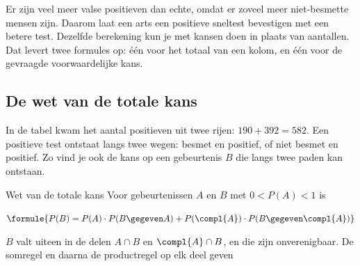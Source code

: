 
Er zijn veel meer valse positieven dan echte, omdat er zoveel meer niet-besmette mensen zijn. Daarom laat een arts een positieve sneltest bevestigen met een betere test. Dezelfde berekening kun je met kansen doen in plaats van aantallen. Dat levert twee formules op: één voor het totaal van een kolom, en één voor de gevraagde voorwaardelijke kans.

\subsection{De wet van de totale kans}

In de tabel kwam het aantal positieven uit twee rijen: $190 + 392 = 582$. Een positieve test ontstaat langs twee wegen: besmet en positief, of niet besmet en positief. Zo vind je ook de kans op een gebeurtenis $B$ die langs twee paden kan ontstaan.

\begin{theorie}
\begin{stelling}{Wet van de totale kans}
Voor gebeurtenissen $A$ en $B$ met $0 < P(A) < 1$ is

\vspace{1mm}
\qquad $\formule{P(B) = P(A) \cdot P(B \gegeven A) + P(\compl{A}) \cdot P(B \gegeven \compl{A})}$
\end{stelling}

\begin{bewijs}
$B$ valt uiteen in de delen $A \cap B$ en $\compl{A} \cap B$, en die zijn onverenigbaar. De somregel en daarna de productregel op elk deel geven
\end{bewijs}
\end{theorie}

